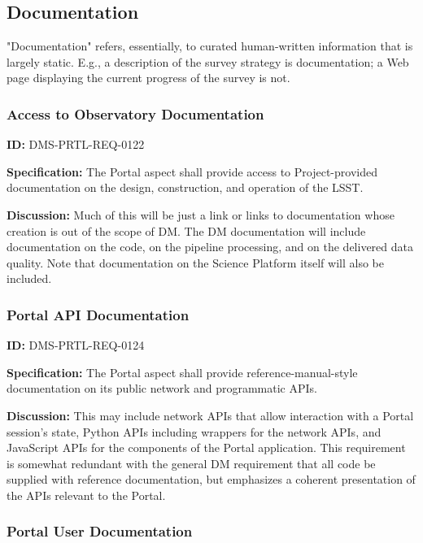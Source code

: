 \documentclass[SE,toc,lsstdraft]{lsstdoc}
\begin{document}
\subsection{Documentation}

"Documentation" refers, essentially, to curated human-written information that is largely static.  E.g., a description of the survey strategy is documentation; a Web page displaying the current progress of the survey is not.

\subsubsection{Access to Observatory Documentation}

\label{DMS-PRTL-REQ-0122}
\textbf{ID:} DMS-PRTL-REQ-0122

\textbf{Specification:}
The Portal aspect shall provide access to Project-provided documentation on the design, construction, and operation of the LSST.

\textbf{Discussion:}
Much of this will be just a link or links to documentation whose creation is out of the scope of DM.  The DM documentation will include documentation on the code, on the pipeline processing, and on the delivered data quality.  Note that documentation on the Science Platform itself will also be included.

\subsubsection{Portal API Documentation}

\label{DMS-PRTL-REQ-0124}
\textbf{ID:} DMS-PRTL-REQ-0124

\textbf{Specification:}
The Portal aspect shall provide reference-manual-style documentation on its public network and programmatic APIs.

\textbf{Discussion:}
This may include network APIs that allow interaction with a Portal session's state, Python APIs including wrappers for the network APIs, and JavaScript APIs for the components of the Portal application.
This requirement is somewhat redundant with the general DM requirement that all code be supplied with reference documentation, but emphasizes a coherent presentation of the APIs relevant to the Portal.

\subsubsection{Portal User Documentation}
\end{document}
